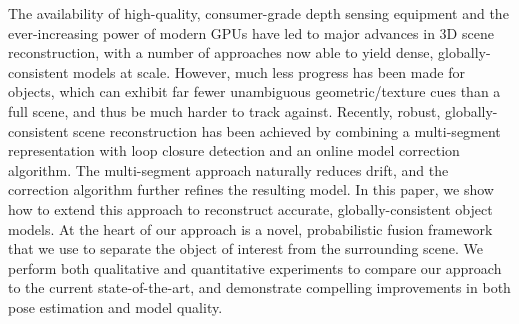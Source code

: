 \noindent The availability of high-quality, consumer-grade depth sensing equipment and the ever-increasing power of modern GPUs have led to major advances in 3D scene reconstruction, with a number of approaches now able to yield dense, globally-consistent models at scale. However, much less progress has been made for objects, which can exhibit far fewer unambiguous geometric/texture cues than a full scene, and thus be much harder to track against. Recently, robust, globally-consistent scene reconstruction has been achieved by combining a multi-segment representation with loop closure detection and an online model correction algorithm. The multi-segment approach naturally reduces drift, and the correction algorithm further refines the resulting model. In this paper, we show how to extend this approach to reconstruct accurate, globally-consistent object models. At the heart of our approach is a novel, probabilistic fusion framework that we use to separate the object of interest from the surrounding scene. We perform both qualitative and quantitative experiments to compare our approach to the current state-of-the-art, and demonstrate compelling improvements in both pose estimation and model quality.